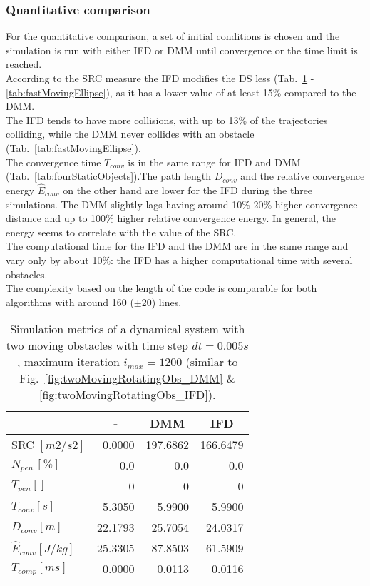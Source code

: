 \subsubsection{Quantitative comparison}
For the quantitative comparison, a set of initial conditions is chosen and the simulation is run with either IFD or DMM until convergence or the time limit is reached. \\ %
According to the SRC measure the IFD modifies the DS less (Tab.~\ref{tab:twoMovingRotatingObs} -\ref{tab:fastMovingEllipse}), as it has a lower value of at least 15\%  compared to the DMM. \\
The IFD tends to have more collisions, with up to 13\% of the trajectories colliding, while the DMM never collides with an obstacle (Tab.~\ref{tab:fastMovingEllipse}). \\
The convergence time $T_{conv}$ is in the same range for IFD and DMM (Tab.~\ref{tab:fourStaticObjects}).The path length $D_{conv}$ and the relative convergence energy $\hat E_{conv}$ on the other hand are lower for the IFD during the three simulations. The DMM slightly lags having around 10\%-20\% higher convergence distance and up to 100\% higher relative convergence energy. In general, the energy seems to correlate with the value of the SRC. \\
The computational time for the IFD and the DMM are in the same range and vary only by about 10\%: the IFD has a higher computational time with several obstacles.  \\
The complexity based on the length of the code is comparable for both algorithms with around 160 ($\pm$20) lines.

\begin{table}[h]
\centering
\caption{Simulation metrics of a dynamical system with two moving obstacles with time step $dt = 0.005 s$, maximum iteration $i_{max} = 1200$ (similar to Fig.~\ref{fig:twoMovingRotatingObs_DMM} \& \ref{fig:twoMovingRotatingObs_IFD}).}
\label{tab:twoMovingRotatingObs}
\begin{tabular}{|l|r|r|r|} \hline
 &\multicolumn{1}{c|}{-} &\multicolumn{1}{c|}{DMM} &\multicolumn{1}{c|}{IFD} \\ \hline
SRC $[m2/s2]$ &0.0000 &197.6862 &166.6479 \\ \hline
$N_{pen} \, [\%]$ &0.0 &0.0 &0.0 \\ \hline
$T_{pen} []$ &0 &0 &0 \\ \hline
$T_{conv} [s]$ &5.3050 &5.9900 &5.9900 \\ \hline
$D_{conv} [m]$ &22.1793 &25.7054 &24.0317 \\ \hline
$\hat E_{conv} [J/kg]$ &25.3305 &87.8503 &61.5909\\ \hline
$T_{comp} [ms]$ &0.0000 &0.0113 &0.0116 \\ \hline
\end{tabular}
\end{table}


